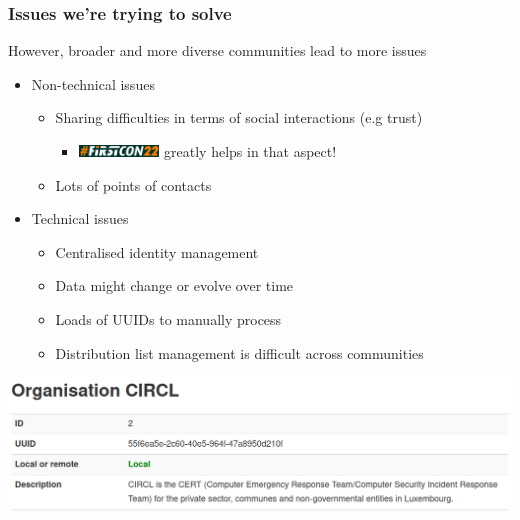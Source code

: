 \begin{frame}
\frametitle{Issues we're trying to solve}
    However, broader and more diverse communities lead to more issues
    \begin{itemize}
        \item {Non-technical issues}
        \begin{itemize}
            \item Sharing difficulties in terms of social interactions (e.g trust)
            \begin{itemize}
                \item \includegraphics[width=80px]{pictures/firstcon-22.png} greatly helps in that aspect!
            \end{itemize}
            \item Lots of points of contacts
        \end{itemize}
    \end{itemize}

    \begin{itemize}
        \item {Technical issues}
        \begin{itemize}
            \item Centralised identity management 
            \item Data might change or evolve over time
            \item Loads of UUIDs to manually process
            \item Distribution list management is difficult across communities
        \end{itemize}
    \end{itemize}
    \begin{center}
        \includegraphics[width=0.8\linewidth]{pictures/org-circl.png}
    \end{center}
\end{frame}

